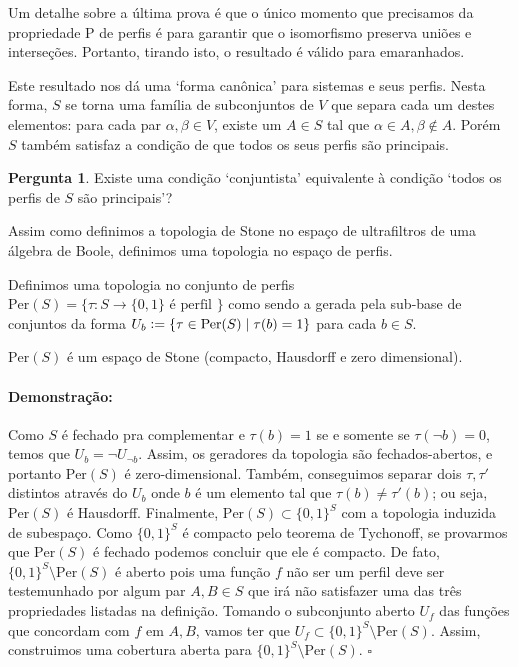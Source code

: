 \documentclass[11pt]{article}
\newcommand{\defeq}{\vcentcolon=}
\newcommand{\pulinho}{\vspace{.5cm}}
\theoremstyle{definition}
\theoremstyle{definition}
\theoremstyle{definition}
\theoremstyle{definition}
\newtheorem*{prop*}{Proposição}
\newenvironment{proposicao*}{
\definecolor{shadecolor}{HTML}{FFDBDF}
\begin{shaded}
\begin{prop*}
}
{
\end{prop*}
\end{shaded}
}
\theoremstyle{definition}
\theoremstyle{definition}
\theoremstyle{definition}
\theoremstyle{definition}
\newtheorem*{definition*}{Definição}
\newenvironment{definicao*}{
\definecolor{shadecolor}{HTML}{defcfc}
\begin{shaded}
\begin{definition*}
}
{
\end{definition*}
\end{shaded}
}
\theoremstyle{definition}
\theoremstyle{definition}
\theoremstyle{definition}
\theoremstyle{definition}
\newenvironment{prova}{\paragraph{Demonstração:}}{\hfill$\square$ 
\pulinho
}
\theoremstyle{definition}
\theoremstyle{definition}
\newtheorem{preguta}{Pergunta}
\newenvironment{pergunta}{
\definecolor{shadecolor}{HTML}{FFF8F0}
\begin{shaded}
\begin{preguta}
}
{
\end{preguta}
\end{shaded}
}
\begin{document}
Um detalhe sobre a última prova é que o único momento que precisamos da propriedade P de perfis é para garantir que o isomorfismo preserva uniões e interseções. Portanto, tirando isto, o resultado é válido para emaranhados.

Este resultado nos dá uma `forma canônica' para sistemas e seus perfis. Nesta forma, $S$ se torna uma família de subconjuntos de $V$ que separa cada um destes elementos: para cada par $\alpha,\beta \in V$, existe um $A \in S$ tal que $\alpha \in A, \beta \notin A$. Porém $S$ também satisfaz a condição de que todos os seus perfis são principais.

\begin{pergunta}
Existe uma condição `conjuntista' equivalente à condição `todos os perfis de $S$ são principais'?
\end{pergunta}

Assim como definimos a topologia de Stone no espaço de ultrafiltros de uma álgebra de Boole, definimos uma topologia no espaço de perfis.

\begin{definicao*}
Definimos uma topologia no conjunto de perfis $\text{Per}(S) = \{\tau: S \rightarrow \{0,1\} \text{ é perfil }\}$ como sendo a gerada pela sub-base de conjuntos da forma $U_b \defeq \{\tau \in \text{Per}(S) \mid \tau(b) = 1\}$ para cada $b \in S$.
\end{definicao*}

\begin{proposicao*}
$\text{Per}(S) $ é um espaço de Stone (compacto, Hausdorff e zero dimensional).
\end{proposicao*}

\begin{prova}
  Como $S$ é fechado pra complementar e $\tau(b) = 1$ se e somente se $\tau(\lnot b) = 0$, temos que $U_b = \lnot U_{\lnot b}$. Assim, os geradores da topologia são fechados-abertos, e portanto $\text{Per}(S)$ é zero-dimensional. Também, conseguimos separar dois $\tau, \tau'$ distintos através do $U_b$ onde $b$ é um elemento tal que $\tau(b) \neq \tau'(b)$; ou seja, $\text{Per}(S)$ é Hausdorff. Finalmente, $\text{Per}(S) \subset \{0,1\}^S$ com a topologia induzida de subespaço. Como $\{0,1\}^S$ é compacto pelo teorema de Tychonoff, se provarmos que $\text{Per}(S)$ é fechado podemos concluir que ele é compacto. De fato, $\{0,1\}^S \setminus \text{Per}(S) $ é aberto pois uma função $f$ não ser um perfil deve ser testemunhado por algum par $A,B \in S$ que irá não satisfazer uma das três propriedades listadas na definição. Tomando o subconjunto aberto $U_f$ das funções que concordam com $f$ em $A,B$, vamos ter que $U_f \subset \{0,1\}^S \setminus \text{Per}(S) $. Assim, construimos uma cobertura aberta para $\{0,1\}^S \setminus \text{Per}(S) $.
\end{prova}
\end{document}
